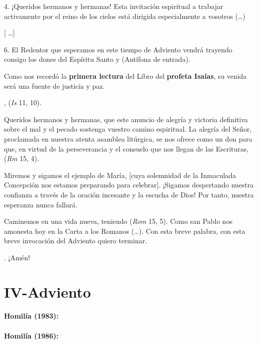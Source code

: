 \begin{body}
\begin{body}
		4. ¡Queridos hermanos y hermanas! Esta invitación espiritual a trabajar activamente por el reino de los cielos está dirigida especialmente a vosotros (\ldots{})

		{[} \ldots{}{]}

		6. El Redentor que esperamos en este tiempo de Adviento vendrá trayendo consigo los dones del Espíritu Santo y  (Antífona de entrada).

		Como nos recordó la \textbf{primera lectura} del Libro del \textbf{profeta Isaías}, su venida será una fuente de justicia y paz.

		,  (\emph{Is} 11, 10).

		Queridos hermanos y hermanas, que este anuncio de alegría y victoria definitiva sobre el mal y el pecado sostenga vuestro camino espiritual. La alegría del Señor, proclamada en nuestra atenta asamblea litúrgica, se nos ofrece como un don para que, en virtud de la perseverancia y el consuelo que nos llegan de las Escrituras,  (\emph{Rm} 15, 4).

		Miremos y sigamos el ejemplo de María, {[}cuya solemnidad de la Inmaculada Concepción nos estamos preparando para celebrar{]}. ¡Sigamos despertando nuestra confianza a través de la oración incesante y la escucha de Dios! Por tanto, nuestra esperanza nunca fallará.

		Caminemos en una vida nueva, teniendo  (\emph{Rom} 15, 5). Como san Pablo nos amonesta hoy en la Carta a los Romanos (\ldots{}). Con esta breve palabra, con esta breve invocación del Adviento quiero terminar.

		. ¡Amén!
	\end{body}

	\chapter{IV-Adviento}

	\subsubsection{Homilía (1983):}

	\subsubsection{Homilía (1986):}


\end{body}
